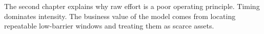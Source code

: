 \begin{summarybox}
The second chapter explains why raw effort is a poor operating principle.
Timing dominates intensity. The business value of the model comes from locating
repeatable low-barrier windows and treating them as scarce assets.
\end{summarybox}
